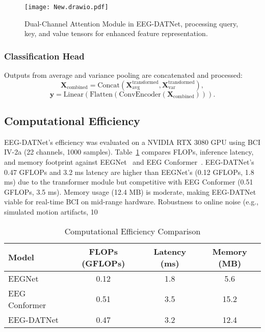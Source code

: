 \documentclass[pdflatex,sn-mathphys-num]{sn-jnl}%
\theoremstyle{thmstyleone}
\theoremstyle{thmstyletwo}
\theoremstyle{thmstylethree}
\begin{document}
\begin{figure*}[h]
    \centering
    \texttt{[image: New.drawio.pdf]}
    \caption{Dual-Channel Attention Module in EEG-DATNet, processing query, key, and value tensors for enhanced feature representation.}
    \label{fig:Dual_Attention_Module}
\end{figure*}

\subsubsection{Classification Head}
Outputs from average and variance pooling are concatenated and processed:
\[
\mathbf{X}_{\text{combined}} = \text{Concat}(\mathbf{X}_{\text{avg}}^{\text{transformed}}, \mathbf{X}_{\text{var}}^{\text{transformed}}),
\]
\[
\mathbf{y} = \text{Linear}(\text{Flatten}(\text{ConvEncoder}(\mathbf{X}_{\text{combined}}))).
\]

\subsection{Computational Efficiency}\label{subsec:comp_eff}
EEG-DATNet’s efficiency was evaluated on a NVIDIA RTX 3080 GPU using BCI IV-2a (22 channels, 1000 samples). Table~\ref{tab:comp_eff} compares FLOPs, inference latency, and memory footprint against EEGNet~\cite{lawhern2018eegnet} and EEG Conformer~\cite{song2023eeg}. EEG-DATNet’s 0.47 GFLOPs and 3.2 ms latency are higher than EEGNet’s (0.12 GFLOPs, 1.8 ms) due to the transformer module but competitive with EEG Conformer (0.51 GFLOPs, 3.5 ms). Memory usage (12.4 MB) is moderate, making EEG-DATNet viable for real-time BCI on mid-range hardware. Robustness to online noise (e.g., simulated motion artifacts, 10%

\begin{table}[!ht]
\centering
\caption{Computational Efficiency Comparison}
\label{tab:comp_eff}
\begin{tabular}{|l|c|c|c|}
\hline
\textbf{Model} & \textbf{FLOPs (GFLOPs)} & \textbf{Latency (ms)} & \textbf{Memory (MB)} \\
\hline
EEGNet & 0.12 & 1.8 & 5.6 \\
EEG Conformer & 0.51 & 3.5 & 15.2 \\
EEG-DATNet & 0.47 & 3.2 & 12.4 \\
\hline
\end{tabular}
\end{table}
\end{document}
